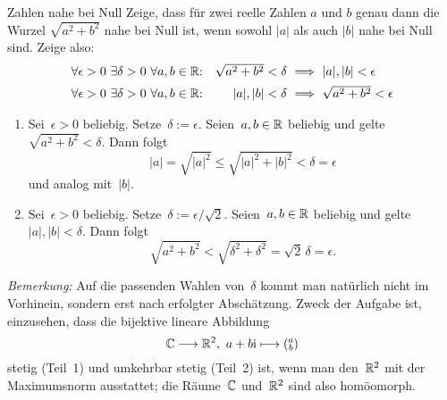 \documentclass{algblatt}
\begin{document}
\begin{aufgabe}{Zahlen nahe bei Null}
Zeige, dass für zwei reelle Zahlen $a$ und $b$ genau dann die Wurzel
$\sqrt{a^2 + b^2}$ nahe bei Null ist, wenn sowohl $|a|$ als auch $|b|$
nahe bei Null sind. Zeige also:
\[ \begin{array}{@{}rr@{\ }c@{\ }l@{}}
  \forall \epsilon > 0\ \exists \delta > 0\ \forall a,b \in \RR{:} &
        \sqrt{a^2 + b^2} < \delta & \implies & |a|, |b| < \epsilon \\[0.5em]
    \forall \epsilon > 0\ \exists \delta > 0\ \forall a,b \in \RR{:} &
        |a|, |b| < \delta & \implies & \sqrt{a^2  + b^2} < \epsilon
\end{array} \]
\vspace{-1.0em}
\begin{loesung}
\begin{enumerate}
\item Sei~$\epsilon > 0$ beliebig. Setze~$\delta := \epsilon$. Seien~$a,b \in
\mathbb{R}$ beliebig und gelte~$\sqrt{a^2 + b^2} < \delta$. Dann folgt
\[ |a| = \sqrt{|a|^2} \leq \sqrt{|a|^2 + |b|^2} < \delta = \epsilon \]
und analog mit~$|b|$.
\item Sei~$\epsilon > 0$ beliebig. Setze~$\delta := \epsilon/\sqrt{2}$.
Seien~$a,b \in \mathbb{R}$ beliebig und gelte~$|a|,|b| < \delta$. Dann folgt
\[ \sqrt{a^2 + b^2} < \sqrt{\delta^2 + \delta^2} = \sqrt{2} \, \delta = \epsilon. \]
\end{enumerate}
\emph{Bemerkung:} Auf die passenden Wahlen von~$\delta$ kommt man natürlich
nicht im Vorhinein, sondern erst nach erfolgter Abschätzung. Zweck der Aufgabe
ist, einzusehen, dass die bijektive lineare Abbildung
\[ \mathbb{C} \longrightarrow \mathbb{R}^2,\ a+b\mathrm{i} \longmapsto
\left(\!\begin{smallmatrix}a\\b\end{smallmatrix}\!\right) \]
stetig (Teil~1) und umkehrbar stetig (Teil~2) ist, wenn man den~$\mathbb{R}^2$ mit der
Maximumsnorm ausstattet; die Räume~$\mathbb{C}$ und~$\mathbb{R}^2$ sind also homöomorph.
\end{loesung}
\end{aufgabe}
\end{document}
